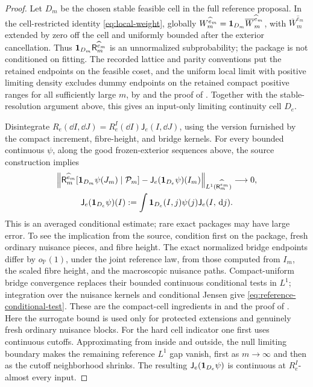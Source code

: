 \begin{proof}
Let \(D_m\) be the chosen stable feasible cell in the full reference
proposal.  In the cell-restricted identity \eqref{eq:local-weight},
globally
\(W_m^{\widehat e_m}=\mathbf 1_{D_m}\overline W_m^{\widehat e_m}\), with
\(\overline W_m^{\widehat e_m}\) extended by zero off the cell and
uniformly bounded after the exterior cancellation.  Thus
\(\mathbf 1_{D_m}\mathsf R_m^{\widehat e_m}\) is an unnormalized
subprobability; the package is not conditioned on fitting.  The recorded
lattice and parity conventions put the retained endpoints on the feasible
coset, and the uniform local limit with positive limiting density excludes
dummy endpoints on the retained compact positive ranges for all
sufficiently large \(m\), by \cite[Lemma~5.5]{C} and the proof of
\cite[Proposition~7.9]{P}.  Together with the stable-resolution argument
above, this gives an input-only limiting continuity cell \(D_e\).

Disintegrate \(R_e(\dd I,\dd J)=R_e^I(\dd I)\mathsf J_e(I,\dd J)\),
using the version furnished by the compact increment, fibre-height, and
bridge kernels.  For every bounded continuous \(\psi\), along the good
frozen-exterior sequences above, the source construction implies
\begin{equation}
\begin{gathered}
 \Big\|
 \mathsf R_m^{\widehat e_m}
   [\mathbf 1_{D_m}\psi(J_m)\mid\mathcal P_m]
 -\mathsf J_e(\mathbf 1_{D_e}\psi)(I_m)
 \Big\|_{L^1(\mathsf R_m^{\widehat e_m})}
 \longrightarrow0,\\
 \mathsf J_e(\mathbf 1_{D_e}\psi)(I)
 :=\int \mathbf 1_{D_e}(I,j)\psi(j)\mathsf J_e(I,\,\mathrm d j).
\end{gathered}
\label{eq:reference-conditional-test}
\end{equation}
This is an averaged conditional estimate; rare exact packages may have
large error.  To see the implication from the source, condition first on
the package, fresh ordinary nuisance pieces, and fibre height.  The exact
normalized bridge endpoints differ by \(o_{\mathbb P}(1)\), under the
joint reference law, from those computed from \(I_m\), the scaled fibre
height, and the macroscopic nuisance paths.  Compact-uniform bridge
convergence replaces their bounded continuous conditional tests in
\(L^1\); integration over the nuisance kernels and conditional Jensen
give \eqref{eq:reference-conditional-test}.  These are the compact-cell
ingredients in \cite[Lemma~5.5 and the proof of Lemma~5.7]{C} and the
proof of \cite[Proposition~7.9]{P}.  Here the surrogate bound is used only
for protected extensions and genuinely fresh ordinary nuisance blocks.
For the hard cell indicator one first uses continuous cutoffs.
Approximating from inside and outside, the null limiting boundary makes
the remaining reference \(L^1\) gap vanish, first as \(m\to\infty\) and
then as the cutoff neighborhood shrinks.  The resulting
\(\mathsf J_e(\mathbf 1_{D_e}\psi)\) is continuous at \(R_e^I\)-almost every
input.


\end{proof}
